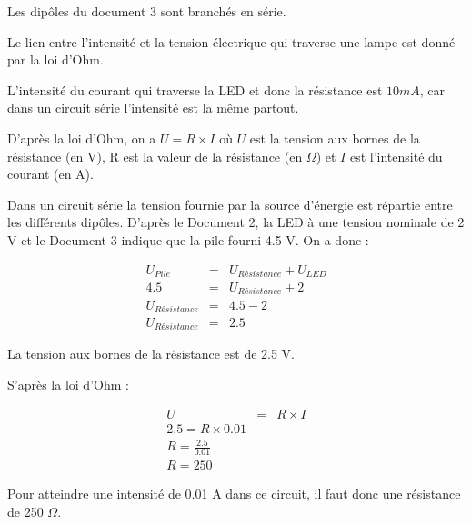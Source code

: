 \documentclass[a4paper,11pt]{exam}
\begin{document}
\begin{questions}
	\question Les dipôles du document 3 sont branchés en série.
	
	\question Le lien entre l'intensité et la tension électrique qui traverse une lampe est donné par la loi d'Ohm.
	
	\question L'intensité du courant qui traverse la LED et donc la résistance est $10 mA$, car dans un circuit série l'intensité est la même partout.
	
	\question D'après la loi d'Ohm, on a $U = R \times I$ où $U$ est la tension aux bornes de la résistance (en V), R est la valeur de la résistance (en $\Omega$) et $I$ est l'intensité du courant (en A).
	
	\question Dans un circuit série la tension fournie par la source d'énergie est répartie entre les différents dipôles. D'après le Document 2, la LED à une tension nominale de 2 V et le Document 3 indique que la pile fourni \num{4.5} V. On a donc :
	
	\begin{eqnarray*}
		U_{Pile} &=& U_{Résistance} + U_{LED} \\
		\num{4.5} &=& U_{Résistance} + 2 \\
		U_{Résistance} &=& \num{4.5} - 2 \\
		U_{Résistance} &=& \num{2.5}
	\end{eqnarray*} 

	La tension aux bornes de la résistance est de \num{2.5} V. 
	
	\question S'après la loi d'Ohm :
	
	
	\begin{eqnarray*}
		U &=& R \times I \\
		\num{2.5} = R \times \num{0.01} \\
		R =  \frac{\num{2.5}}{\num{0.01}} \\
		R = 250
	\end{eqnarray*}

	Pour atteindre une intensité de \num{0.01} A dans ce circuit, il faut donc une résistance de 250 $\Omega$.  
\end{questions}
\label{LastPage}
\end{document}
